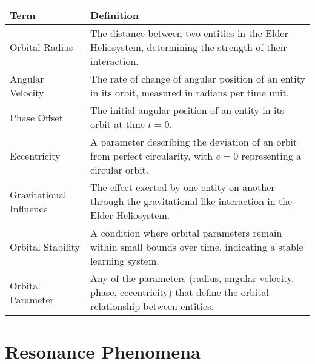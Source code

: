 \begin{center}
\begin{tabular}{|l|p{12cm}|}
\hline
\textbf{Term} & \textbf{Definition} \\
\hline
Orbital Radius & The distance between two entities in the Elder Heliosystem, determining the strength of their interaction. \\
\hline
Angular Velocity & The rate of change of angular position of an entity in its orbit, measured in radians per time unit. \\
\hline
Phase Offset & The initial angular position of an entity in its orbit at time $t=0$. \\
\hline
Eccentricity & A parameter describing the deviation of an orbit from perfect circularity, with $e=0$ representing a circular orbit. \\
\hline
Gravitational Influence & The effect exerted by one entity on another through the gravitational-like interaction in the Elder Heliosystem. \\
\hline
Orbital Stability & A condition where orbital parameters remain within small bounds over time, indicating a stable learning system. \\
\hline
Orbital Parameter & Any of the parameters (radius, angular velocity, phase, eccentricity) that define the orbital relationship between entities. \\
\hline
\end{tabular}
\label{tab:orbital_terminology}
\end{center}

\section{Resonance Phenomena}

